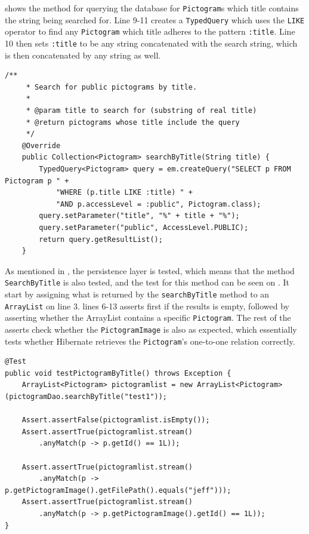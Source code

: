  shows the method for querying the database for \texttt{Pictogram}s which title contains the string being searched for.
Line 9-11 creates a \texttt{TypedQuery} which uses the \texttt{LIKE} operator to find any \texttt{Pictogram} which title adheres to the pattern \texttt{:title}.
Line 10 then sets \texttt{:title} to be any string concatenated with the search string, which is then concatenated by any string as well.
\begin{lstlisting}[float, floatplacement=h, caption={The method which searches through all \texttt{Pictogram}s by their titles.},label={lst:pictogramByTitle}]
    /**
     * Search for public pictograms by title.
     *
     * @param title to search for (substring of real title)
     * @return pictograms whose title include the query
     */
    @Override
    public Collection<Pictogram> searchByTitle(String title) {
        TypedQuery<Pictogram> query = em.createQuery("SELECT p FROM Pictogram p " +
            "WHERE (p.title LIKE :title) " +
            "AND p.accessLevel = :public", Pictogram.class);
        query.setParameter("title", "%" + title + "%");
        query.setParameter("public", AccessLevel.PUBLIC);
        return query.getResultList();
    }
\end{lstlisting}

As mentioned in , the persistence layer is tested, which  means that the method \texttt{SearchByTitle} is also tested, and the test for this method can be seen on .
It start by assigning what is returned by the \texttt{searchByTitle} method to an \texttt{ArrayList} on line 3.
lines 6-13 asserts first if the results is empty, followed by asserting whether the ArrayList contains a specific \texttt{Pictogram}.
The rest of the asserts check whether the \texttt{PictogramImage} is also as expected, which essentially tests whether Hibernate retrieves the \texttt{Pictogram}'s one-to-one relation correctly.

\begin{lstlisting}[float, floatplacement=h, caption={The test method which tests the method \texttt{SearchByTitle}.},label={lst:pictogramByTitleTest}]
@Test
public void testPictogramByTitle() throws Exception {
    ArrayList<Pictogram> pictogramlist = new ArrayList<Pictogram>(pictogramDao.searchByTitle("test1"));

    Assert.assertFalse(pictogramlist.isEmpty());
    Assert.assertTrue(pictogramlist.stream()
    	.anyMatch(p -> p.getId() == 1L));

    Assert.assertTrue(pictogramlist.stream()
    	.anyMatch(p -> p.getPictogramImage().getFilePath().equals("jeff")));
    Assert.assertTrue(pictogramlist.stream()
    	.anyMatch(p -> p.getPictogramImage().getId() == 1L));
}
\end{lstlisting}

